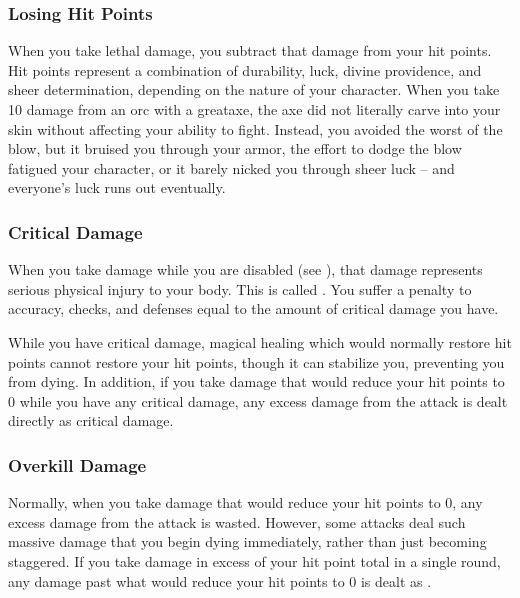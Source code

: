         \subsubsection{Losing Hit Points}
            When you take lethal damage, you subtract that damage from your hit points.
             Hit points represent a combination of durability, luck, divine providence, and sheer determination, depending on the nature of your character.
            When you take 10 damage from an orc with a greataxe, the axe did not literally carve into your skin without affecting your ability to fight.
            Instead, you avoided the worst of the blow, but it bruised you through your armor, the effort to dodge the blow fatigued your character, or it barely nicked you through sheer luck -- and everyone's luck runs out eventually.

        \subsubsection{Critical Damage}\label{Critical Damage}
            When you take damage while you are disabled (see ), that damage represents serious physical injury to your body.
            This is called .
            You suffer a penalty to accuracy, checks, and defenses equal to the amount of critical damage you have.

            While you have critical damage, magical healing which would normally restore hit points cannot restore your hit points, though it can stabilize you, preventing you from dying.
            In addition, if you take damage that would reduce your hit points to 0 while you have any critical damage, any excess damage from the attack is dealt directly as critical damage.

        \subsubsection{Overkill Damage}\label{Overkill Damage}
            Normally, when you take damage that would reduce your hit points to 0, any excess damage from the attack is wasted.
            However, some attacks deal such massive damage that you begin dying immediately, rather than just becoming staggered.
            If you take damage in excess of your  hit point total in a single round, any damage past what would reduce your hit points to 0 is dealt as .

